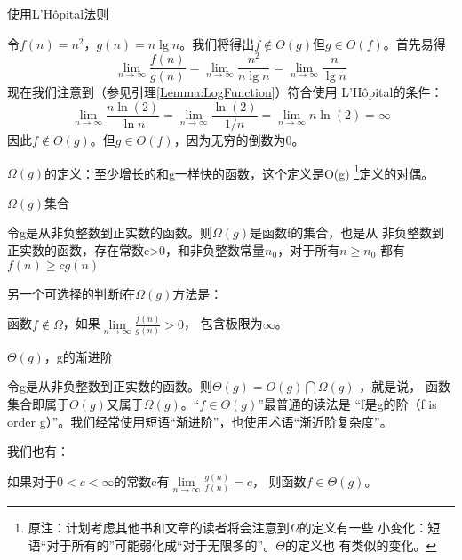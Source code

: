 \begin{example}
使用L'H\^{o}pital法则

令$f(n)=n^2$，$g(n)=n\lg n$。我们将得出$f\notin O(g)$但$g\in O(f)$。首先易得
\begin{displaymath}
\lim\limits_{n\rightarrow \infty}\frac{f(n)}{g(n)} =
\lim\limits_{n\rightarrow \infty}\frac{n^2}{n\lg n}=
\lim\limits_{n\rightarrow \infty}\frac{n}{\lg n}
\end{displaymath}
现在我们注意到（参见引理\ref{Lemma:LogFunction}）符合使用
L'H\^{o}pital的条件：
\begin{displaymath}
\lim\limits_{n\rightarrow \infty} \frac{n\ln(2)}{\ln n}=
\lim\limits_{n\rightarrow \infty} \frac{\ln(2)}{1/n}=
\lim\limits_{n\rightarrow \infty}n\ln(2)= \infty
\end{displaymath}
因此$f\notin O(g)$。但$g\in O(f)$，因为无穷的倒数为0。

\end{example}

$\Omega(g)$的定义：至少增长的和g一样快的函数，这个定义是Ο(g)
\footnote{原注：计划考虑其他书和文章的读者将会注意到$\Omega$的定义有一些
小变化：短语“对于所有的”可能弱化成“对于无限多的”。$\Theta$的定义也
有类似的变化。}定义的对偶。

\begin{definition}
$\Omega(g)$集合

令g是从非负整数到正实数的函数。则$\Omega(g)$是函数f的集合，也是从
非负整数到正实数的函数，存在常数c>0，和非负整数常量$n_0$，对于所有$n\geq n_0$
都有$f(n)\geq cg(n)$
\end{definition}

另一个可选择的判断f在$\Omega(g)$方法是：

\begin{lemma}
函数$f\notin \Omega$，如果$\lim\limits_{n\rightarrow \infty}\frac{f(n)}{g(n)}>0$，
包含极限为$\infty$。
\end{lemma}

\begin{definition}
$\Theta(g)$，g的渐进阶

令g是从非负整数到正实数的函数。则$\Theta(g)=O(g)\bigcap\Omega(g)$ ，就是说，
函数集合即属于$O(g)$又属于$\Omega(g)$。“$f\in \Theta(g)$”最普通的读法是
“f是g的阶（f is order g）”。我们经常使用短语“渐进阶”，也使用术语“渐近阶复杂度”。
\end{definition}

我们也有：

\begin{lemma}
如果对于$0<c<\infty$的常数c有$\lim\limits_{n\rightarrow \infty}\frac{g(n)}{f(n)}=c$，
则函数$f\in \Theta(g)$。
\end{lemma}


